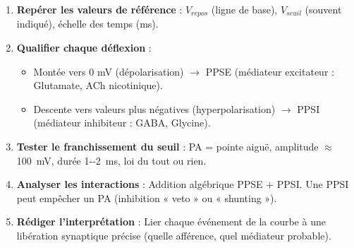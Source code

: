 \documentclass[11pt]{article}
\newcommand{\cle}[1]{{\popxbold\color{popdark}#1}}
\begin{document}
\begin{methode}
\begin{enumerate}
\item \textbf{Repérer les valeurs de référence} : $V_{repos}$ (ligne de base), $V_{seuil}$ (souvent indiqué), échelle des temps (ms).
\item \textbf{Qualifier chaque déflexion} :
\begin{itemize}
\item Montée vers 0 mV (dépolarisation) $\rightarrow$ \cle{PPSE} (médiateur excitateur : Glutamate, ACh nicotinique).
\item Descente vers valeurs plus négatives (hyperpolarisation) $\rightarrow$ \cle{PPSI} (médiateur inhibiteur : GABA, Glycine).
\end{itemize}
\item \textbf{Tester le franchissement du seuil} : PA = pointe aiguë, amplitude $\approx$ \SI{100}{mV}, durée \SI{1--2}{ms}, loi du tout ou rien.
\item \textbf{Analyser les interactions} : Addition algébrique PPSE + PPSI. Une PPSI peut empêcher un PA (inhibition « veto » ou « shunting »).
\item \textbf{Rédiger l'interprétation} : Lier chaque événement de la courbe à une libération synaptique précise (quelle afférence, quel médiateur probable).
\end{enumerate}
\end{methode}
\end{document}
